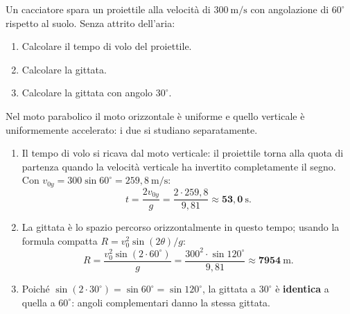 \begin{question}[ID=1.1, subtitle={Proiettile a 60° — tempo di volo e gittata}, tags={moto parabolico, gittata}, difficulty=facile]
Un cacciatore spara un proiettile alla velocità di $300\ \mathrm{m/s}$ con angolazione di $60^\circ$ rispetto al suolo. Senza attrito dell'aria:
\begin{enumerate}
\item Calcolare il tempo di volo del proiettile.
\item Calcolare la gittata.
\item Calcolare la gittata con angolo $30^\circ$.
\end{enumerate}

\begin{solution}
Nel moto parabolico il moto orizzontale è uniforme e quello verticale è uniformemente accelerato: i due si studiano separatamente.
\begin{enumerate}
\item Il tempo di volo si ricava dal moto verticale: il proiettile torna alla quota di partenza quando la velocità verticale ha invertito completamente il segno. Con $v_{0y} = 300\sin 60^\circ = 259{,}8\ \mathrm{m/s}$:
\[
t = \frac{2v_{0y}}{g} = \frac{2\cdot 259{,}8}{9{,}81} \approx \mathbf{53{,}0\ \mathrm{s}}.
\]
\item La gittata è lo spazio percorso orizzontalmente in questo tempo; usando la formula compatta $R = v_0^2\sin(2\theta)/g$:
\[
R = \frac{v_0^2\sin(2\cdot 60^\circ)}{g} = \frac{300^2\cdot\sin 120^\circ}{9{,}81} \approx \mathbf{7954\ \mathrm{m}}.
\]
\item Poiché $\sin(2\cdot 30^\circ) = \sin 60^\circ = \sin 120^\circ$, la gittata a $30^\circ$ è \textbf{identica} a quella a $60^\circ$: angoli complementari danno la stessa gittata.
\end{enumerate}
\end{solution}
\end{question}


